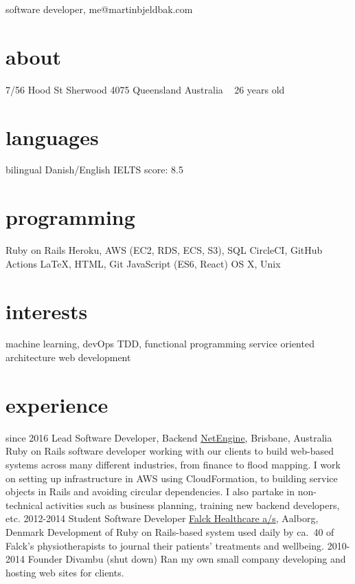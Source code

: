 \documentclass{afriggeri-cv/friggeri-cv}
\begin{document}
{software developer, me@martinbjeldbak.com}

\begin{aside}
  \section{about}
    7/56 Hood St
    Sherwood 4075
    Queensland
    Australia
    ~
    26 years old
  \section{languages}
    bilingual Danish/English
    IELTS score: 8.5
  \section{programming}
    Ruby on Rails
    Heroku, AWS (EC2, RDS, ECS, S3), SQL
    CircleCI, GitHub Actions
    \LaTeX, HTML, Git
    JavaScript (ES6, React)
    OS X, Unix
  \section{interests}
    machine learning, devOps
    TDD, functional programming
    service oriented architecture
    web development
\end{aside}

\section{experience}

\begin{entrylist}
  \entry%
    {since 2016}
    {Lead Software Developer, Backend}
    {\href{http://netengine.com.au/}{NetEngine}, Brisbane, Australia}
    {Ruby on Rails software developer working with our clients to build web-based systems across
      many different industries, from finance to flood mapping. I work on setting up infrastructure
      in AWS using CloudFormation, to building service objects in Rails and avoiding circular dependencies. I also partake in non-technical activities such as business planning, training new backend developers, etc.}
  \entry%
    {2012-2014}
    {Student Software Developer}
    {\href{http://www.falck.com/en/company/organisation/business-areas/healthcare}{Falck Healthcare a/s}, Aalborg, Denmark}
    {Development of Ruby on Rails-based system used daily by ca.\ 40 of Falck's physiotherapists to journal their patients' treatments and wellbeing.}
  \entry
    {2010-2014}
    {Founder}
    {Divambu (shut down)}
    {Ran my own small company developing and hosting web sites for clients.}
\end{entrylist}
\end{document}
